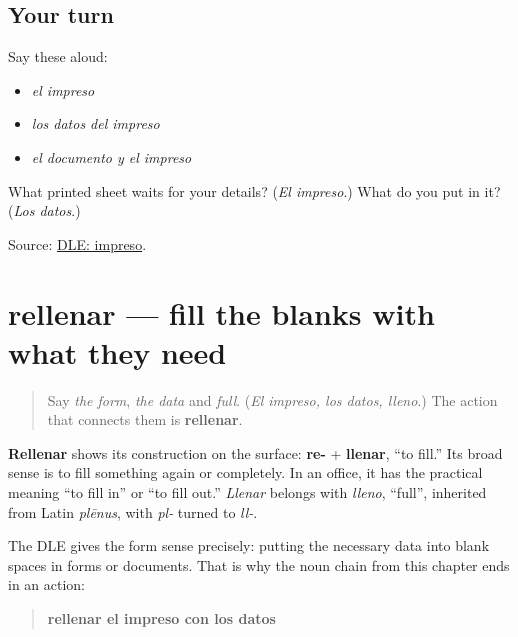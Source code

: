 \subsection*{Your turn}
Say these aloud:

\begin{itemize}
\raggedright
  \item \emph{el impreso}
  \item \emph{los datos del impreso}
  \item \emph{el documento y el impreso}
\end{itemize}

\begin{tcolorbox}[breakable,colback=teal!4,colframe=teal!35!black,title={Before you move on}]
What printed sheet waits for your details? (\emph{El impreso}.) What do you put in it? (\emph{Los datos}.)

Source: \href{https://dle.rae.es/impreso}{DLE: impreso}.
\end{tcolorbox}
\section[rellenar]{rellenar — fill the blanks with what they need}

\label{lesson:ES-C406-rellenar}



\begin{quote}
Say \emph{the form}, \emph{the data} and \emph{full}. (\emph{El impreso, los datos, lleno}.) The action that connects them is \textbf{rellenar}.
\end{quote}

\begin{cousinweb}
\textbf{Rellenar} shows its construction on the surface: \textbf{re-} + \textbf{llenar}, “to fill.” Its broad sense is to fill something again or completely. In an office, it has the practical meaning “to fill in” or “to fill out.” \emph{Llenar} belongs with \emph{lleno}, “full”, inherited from Latin \emph{plēnus}, with \emph{pl-} turned to \emph{ll-}.

The DLE gives the form sense precisely: putting the necessary data into blank spaces in forms or documents. That is why the noun chain from this chapter ends in an action:

\begin{quote}
\textbf{rellenar el impreso con los datos}
\end{quote}
\end{cousinweb}


